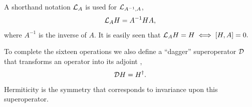 A shorthand notation ${\cal{L}}_{A}$ is  used for ${\cal{L}}_{A^{-1},A}$,
%
\begin{equation}
{\cal{L}}_{A}H=A^{-1}HA,
\end{equation}
%
where $A^{-1}$ is the inverse of $A$.
It is easily seen that  ${\cal{L}}_{A}H=H \iff [H,A]=0.$

To complete the sixteen operations we also define a ``dagger'' superoperator ${\cal{D}}$ that transforms an operator  into its adjoint \cite{Simon2018},
%
\begin{equation}
{\cal{D}}H=H^{\dagger}.
\end{equation}
%
{Hermiticity is  the symmetry that corresponds to invariance upon this superoperator.}
%


